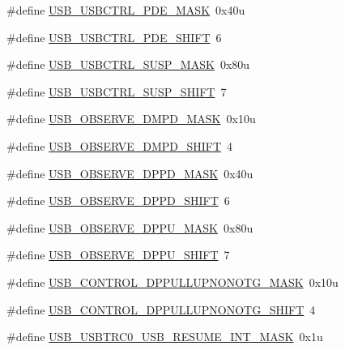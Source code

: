 \begin{DoxyCompactItemize}
\#define \hyperlink{group___u_s_b___register___masks_ga7fb8345a32022ec5df5129278d1aed30}{U\+S\+B\+\_\+\+U\+S\+B\+C\+T\+R\+L\+\_\+\+P\+D\+E\+\_\+\+M\+A\+SK}~0x40u
\item 
\#define \hyperlink{group___u_s_b___register___masks_gaaf556df66acd4f6ff2bc1f4fad1a05ed}{U\+S\+B\+\_\+\+U\+S\+B\+C\+T\+R\+L\+\_\+\+P\+D\+E\+\_\+\+S\+H\+I\+FT}~6
\item 
\#define \hyperlink{group___u_s_b___register___masks_gac65859ca12bfe997afc67545c8b1a052}{U\+S\+B\+\_\+\+U\+S\+B\+C\+T\+R\+L\+\_\+\+S\+U\+S\+P\+\_\+\+M\+A\+SK}~0x80u
\item 
\#define \hyperlink{group___u_s_b___register___masks_ga44772d68648a57e6341ceec7fd5268f3}{U\+S\+B\+\_\+\+U\+S\+B\+C\+T\+R\+L\+\_\+\+S\+U\+S\+P\+\_\+\+S\+H\+I\+FT}~7
\item 
\#define \hyperlink{group___u_s_b___register___masks_ga796850497f75cc88772d3826d1196a43}{U\+S\+B\+\_\+\+O\+B\+S\+E\+R\+V\+E\+\_\+\+D\+M\+P\+D\+\_\+\+M\+A\+SK}~0x10u
\item 
\#define \hyperlink{group___u_s_b___register___masks_ga044fcfc292ba6db33ec4e847a6510440}{U\+S\+B\+\_\+\+O\+B\+S\+E\+R\+V\+E\+\_\+\+D\+M\+P\+D\+\_\+\+S\+H\+I\+FT}~4
\item 
\#define \hyperlink{group___u_s_b___register___masks_ga8368ad607c0f5a0ab499734e26f36aad}{U\+S\+B\+\_\+\+O\+B\+S\+E\+R\+V\+E\+\_\+\+D\+P\+P\+D\+\_\+\+M\+A\+SK}~0x40u
\item 
\#define \hyperlink{group___u_s_b___register___masks_gaba84f8caae5d942588bd678bbc2ad267}{U\+S\+B\+\_\+\+O\+B\+S\+E\+R\+V\+E\+\_\+\+D\+P\+P\+D\+\_\+\+S\+H\+I\+FT}~6
\item 
\#define \hyperlink{group___u_s_b___register___masks_ga04f8b1d77478cb027a79323cef482965}{U\+S\+B\+\_\+\+O\+B\+S\+E\+R\+V\+E\+\_\+\+D\+P\+P\+U\+\_\+\+M\+A\+SK}~0x80u
\item 
\#define \hyperlink{group___u_s_b___register___masks_ga08ff5b00473fda9eb458f3457490eb15}{U\+S\+B\+\_\+\+O\+B\+S\+E\+R\+V\+E\+\_\+\+D\+P\+P\+U\+\_\+\+S\+H\+I\+FT}~7
\item 
\#define \hyperlink{group___u_s_b___register___masks_ga764d9d972859eeded5e092a77eb4de79}{U\+S\+B\+\_\+\+C\+O\+N\+T\+R\+O\+L\+\_\+\+D\+P\+P\+U\+L\+L\+U\+P\+N\+O\+N\+O\+T\+G\+\_\+\+M\+A\+SK}~0x10u
\item 
\#define \hyperlink{group___u_s_b___register___masks_ga5bae9683a5ae7c48617b8d24a35786ce}{U\+S\+B\+\_\+\+C\+O\+N\+T\+R\+O\+L\+\_\+\+D\+P\+P\+U\+L\+L\+U\+P\+N\+O\+N\+O\+T\+G\+\_\+\+S\+H\+I\+FT}~4
\item 
\#define \hyperlink{group___u_s_b___register___masks_ga9c943cc95fdf52fa40311292f2801518}{U\+S\+B\+\_\+\+U\+S\+B\+T\+R\+C0\+\_\+\+U\+S\+B\+\_\+\+R\+E\+S\+U\+M\+E\+\_\+\+I\+N\+T\+\_\+\+M\+A\+SK}~0x1u

\end{DoxyCompactItemize}
